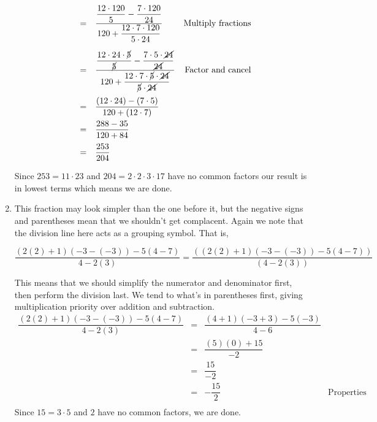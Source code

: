 \begin{ex}
\begin{enumerate}
\[\begin{array}{rclr}
& = & \dfrac{\dfrac{12 \cdot 120}{5} - \dfrac{7 \cdot 120}{24}}{120 + \dfrac{12 \cdot 7 \cdot 120}{5 \cdot 24}} & \text{Multiply fractions} \\ [25pt]

& = & \dfrac{\dfrac{12 \cdot 24 \cdot \cancel{5}}{\cancel{5}} - \dfrac{7 \cdot 5 \cdot \cancel{24}}{\cancel{24}}}{120 + \dfrac{12 \cdot 7 \cdot \cancel{5} \cdot \cancel{24}}{\cancel{5} \cdot \cancel{24}}} & \text{Factor and cancel} \\[25pt]
 & = & \dfrac{(12 \cdot 24) - (7 \cdot 5)}{120 + (12 \cdot 7)} & \\[10pt]
 & = & \dfrac{288 - 35}{120 + 84} & \\[10pt]
 & = & \dfrac{253}{204} & \\
  \end{array} \] 
 
Since $253 = 11 \cdot 23$ and $204 = 2 \cdot 2 \cdot 3 \cdot 17$ have no common factors our result is in lowest terms which means we are done.


																					
\item  This fraction may look simpler than the one before it, but the negative signs and parentheses mean that we shouldn't get complacent.  Again we note that the division line here acts as a grouping symbol.  That is, 

\[ \dfrac{(2(2)+1)(-3-(-3)) - 5(4-7)}{4-2(3)} = \dfrac{\left((2(2)+1)(-3-(-3)) - 5(4-7) \right)}{(4-2(3))} \]

This means that we should simplify the numerator and denominator first, then perform the division last.  We tend to what's in parentheses first, giving multiplication priority over addition and subtraction.\[ \begin{array}{rclr}


\dfrac{(2(2)+1)(-3-(-3)) - 5(4-7)}{4-2(3)} & = & \dfrac{(4+1)(-3+3)-5(-3)}{4 - 6} &  \\ [8pt]
                                           & = & \dfrac{(5)(0) + 15}{-2}  & \\ [8pt]
																					 & = & \dfrac{15}{-2} & \\ [8pt]
																					 & = & -\dfrac{15}{2} & \text{Properties of Negatives} \\ \end{array} \]
Since $15 = 3\cdot 5$ and $2$ have no common factors, we are done.
																			




\end{enumerate}
\end{ex}
